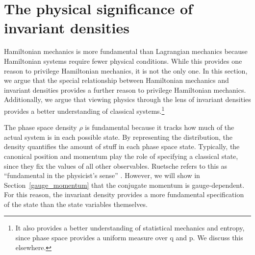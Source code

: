 \documentclass[12pt, english, twoside]{article} %
\begin{document}
\section{The physical significance of invariant densities}
\label{density}

Hamiltonian mechanics is more fundamental than Lagrangian mechanics because Hamiltonian systems require fewer physical conditions. While this provides one reason to privilege Hamiltonian mechanics, it is not the only one. In this section, we argue that the special relationship between Hamiltonian mechanics and invariant densities provides a further reason to privilege Hamiltonian mechanics. Additionally, we argue that viewing physics through the lens of invariant densities provides a better understanding of classical systems.\footnote{It also provides a better understanding of statistical mechanics and entropy, since phase space provides a uniform measure over q and p. We discuss this elsewhere.}

The phase space density $\rho$ is fundamental because it tracks how much of the actual system is in each possible state. By representing the distribution, the density quantifies the amount of stuff in each phase space state. Typically, the canonical position and momentum play the role of specifying a classical state, since they fix the values of all other observables. Ruetsche refers to this as ``fundamental in the physicist's sense'' \parencite*[31, 200]{Ruetsche}. However, we will show in Section~\ref{gauge_momentum} that the conjugate momentum is gauge-dependent. For this reason, the invariant density provides a more fundamental specification of the state than the state variables themselves.
\end{document}
